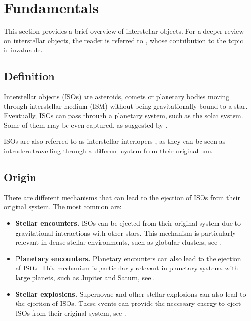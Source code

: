 \section{Fundamentals}

This section provides a brief overview of interstellar objects. For a deeper
review on interstellar objects, the reader is referred to \cite{jewitt2022},
whose contribution to the topic is invaluable.

\subsection{Definition}
Interstellar objects (ISOs) are asteroids, comets or planetary bodies moving
through interstellar medium (ISM) without being gravitationally bound to a star.
Eventually, ISOs can pass through a planetary system, such as the solar system.
Some of them may be even captured, as suggested by \cite{napier2021}.

ISOs are also referred to as interstellar interlopers \cite{jewitt2022}, as they
can be seen as intruders travelling through a different system from their
original one.

\subsection{Origin}
There are different mechanisms that can lead to the ejection of ISOs from their
original system. The most common are:

\begin{itemize}
  \item \textbf{Stellar encounters.} ISOs can be ejected from their original
        system due to gravitational interactions with other stars. This
        mechanism is particularly relevant in dense stellar environments, such
        as globular clusters, see \cite{fouchard2011}.

  \item \textbf{Planetary encounters.} Planetary encounters can also lead to
        the ejection of ISOs. This mechanism is particularly relevant in
        planetary systems with large planets, such as Jupiter and Saturn, see
        \cite{horner2003}.

  \item \textbf{Stellar explosions.} Supernovae and other stellar explosions
        can also lead to the ejection of ISOs. These events can provide the
        necessary energy to eject ISOs from their original system, see
        \cite{portegies2018}.
\end{itemize}

